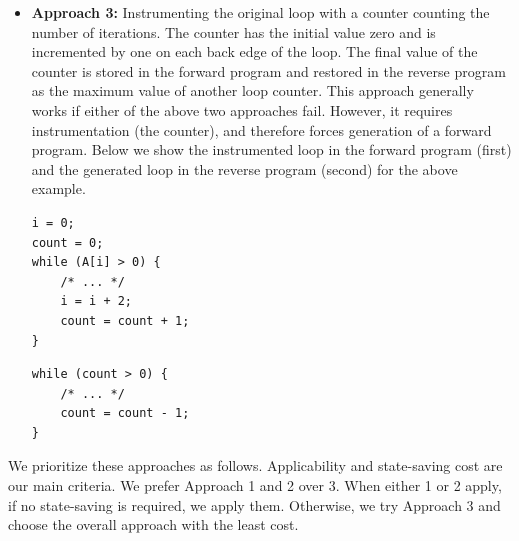\begin{itemize}

\item \textbf{Approach 3:} Instrumenting the original loop with a counter counting the number of iterations. The counter has the initial value zero and is incremented by one on each back edge of the loop.
The final value of the counter is stored in the forward program and restored in the reverse program as the maximum value of another loop counter.
This approach generally works if either of the above two approaches fail.
However, it requires instrumentation (the counter), and therefore forces generation of a forward program. Below we show the instrumented loop in the forward program (first) and the generated loop in the reverse program (second) for the above example.

\begin{lstlisting}
i = 0;
count = 0;
while (A[i] > 0) {
    /* ... */
    i = i + 2;
    count = count + 1;
}
\end{lstlisting}


\begin{lstlisting}
while (count > 0) {
    /* ... */
    count = count - 1;
}
\end{lstlisting}


\end{itemize}

We prioritize these approaches as follows.
Applicability and state-saving cost are our main criteria.
We prefer Approach 1 and 2 over 3.
When either 1 or 2 apply, if no state-saving is required, we apply them.
Otherwise, we try Approach 3 and choose the overall approach with the least cost.

